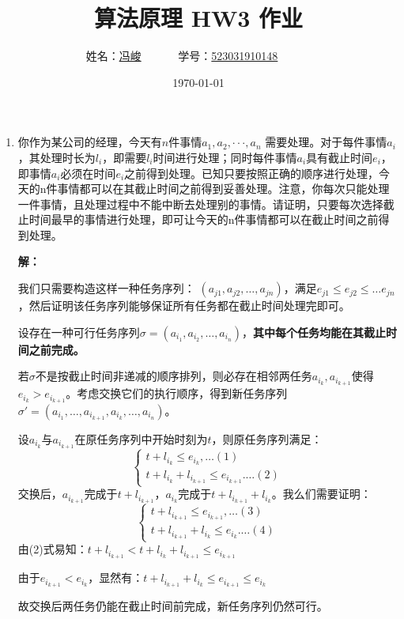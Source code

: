\documentclass[UTF8,12pt,a4paper]{ctexart}
\title{算法原理 HW3 作业}
\author{
	姓名：\underline{冯峻}~~~~~~
	学号：\underline{523031910148}~~~~~~}
\date{\today}
\begin{document}
\fancyfoot[C]{\thepage}

\maketitle


\begin{enumerate}[1.]
	\item 你作为某公司的经理，今天有$n$件事情$a_1,a_2,··· ,a_n$ 需要处理。对于每件事情$a_i$，其处理时长为$l_i$，即需要$l_i$时间进行处理；同时每件事情$a_i$具有截止时间$e_i$，即事情$a_i$必须在时间$e_i$之前得到处理。已知只要按照正确的顺序进行处理，今天的n件事情都可以在其截止时间之前得到妥善处理。注意，你每次只能处理一件事情，且处理过程中不能中断去处理别的事情。请证明，只要每次选择截止时间最早的事情进行处理，即可让今天的n件事情都可以在截止时间之前得到处理。

	\textbf{解：}

	我们只需要构造这样一种任务序列： $(a_{j1}, a_{j2}, \dots, a_{jn})$，满足$e_{j1}\leq e_{j2}\leq \dots e_{jn}$，然后证明该任务序列能够保证所有任务都在截止时间处理完即可。

	设存在一种可行任务序列$\sigma=(a_{i_1},a_{i_2},\dots,a_{i_n})$，\textbf{其中每个任务均能在其截止时间之前完成。}
	
	若$\sigma$不是按截止时间非递减的顺序排列，则必存在相邻两任务$a_{i_k},a_{i_{k+1}}$使得$e_{i_k}>e_{i_{k+1}}$。考虑交换它们的执行顺序，得到新任务序列$\sigma'=(a_{i_1},\dots,a_{i_{k+1}},a_{i_k},\dots,a_{i_n})$。

	设$a_{i_k}$与$a_{i_{k+1}}$在原任务序列中开始时刻为$t$，则原任务序列满足：
	\[
	\begin{cases}
	t+l_{i_k} \le e_{i_k}, \dots (1)\\
	t+l_{i_k}+l_{i_{k+1}} \le e_{i_{k+1}}. \dots (2)
	\end{cases}
	\]
	交换后，$a_{i_{k+1}}$完成于$t+l_{i_{k+1}}$，$a_{i_k}$完成于$t+l_{i_{k+1}}+l_{i_k}$。我么们需要证明：
	\[
	\begin{cases}
	t+l_{i_{k+1}} \le e_{i_{k+1}}, \dots (3)\\
	t+l_{i_{k+1}}+l_{i_{k}} \le e_{i_{k}}. \dots (4)
	\end{cases}
	\]
	由(2)式易知：$t+l_{i_{k+1}} < t+l_{i_k}+l_{i_{k+1}} \le e_{i_{k+1}}$

	由于$e_{i_{k+1}}<e_{i_k}$，显然有：$t+l_{i_{k+1}}+l_{i_k} \le e_{i_{k+1}} \le e_{i_k}$
	
	故交换后两任务仍能在截止时间前完成，新任务序列仍然可行。


\end{enumerate}
\end{document}
